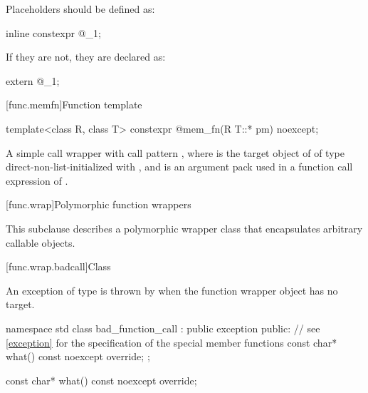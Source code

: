 \pnum
Placeholders should be defined as:
\begin{codeblock}
inline constexpr @\unspec@ _1{};
\end{codeblock}
If they are not, they are declared as:
\begin{codeblock}
extern @\unspec@ _1;
\end{codeblock}%

[func.memfn]{Function template }%

%
\begin{itemdecl}
template<class R, class T> constexpr @\unspec@ mem_fn(R T::* pm) noexcept;
\end{itemdecl}

\begin{itemdescr}
\pnum
\returns
A simple call wrapper 
with call pattern , where
 is the target object of  of type 
direct-non-list-initialized with , and
 is an argument pack
used in a function call expression of .
\end{itemdescr}

[func.wrap]{Polymorphic function wrappers}%

\pnum
This subclause describes a polymorphic wrapper class that
encapsulates arbitrary callable objects.

[func.wrap.badcall]{Class }%
%

\pnum
An exception of type  is thrown by
when the function wrapper object has no target.

\begin{codeblock}
namespace std {
  class bad_function_call : public exception {
  public:
    // see \ref{exception} for the specification of the special member functions
    const char* what() const noexcept override;
  };
}
\end{codeblock}

%
\begin{itemdecl}
const char* what() const noexcept override;
\end{itemdecl}

